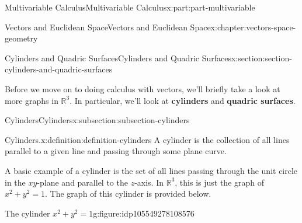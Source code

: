 \documentclass[twoside,10pt,]{book}
\newcommand{\terminology}[1]{\textbf{#1}}
\numberwithin{equation}{part}
\newlength{\qrsize}
\newlength{\previewwidth}
\newcommand{\RR}{\mathbb{R}}
\begin{document}
\begin{partptx}{Multivariable Calculus}{}{Multivariable Calculus}{}{}{x:part:part-multivariable}
\begin{chapterptx}{Vectors and Euclidean Space}{}{Vectors and Euclidean Space}{}{}{x:chapter:vectors-space-geometry}
%
%
\typeout{************************************************}
\typeout{************************************************}
%
\begin{sectionptx}{Cylinders and Quadric Surfaces}{}{Cylinders and Quadric Surfaces}{}{}{x:section:section-cylinders-and-quadric-surfaces}
\begin{introduction}{}%
Before we move on to doing calculus with vectors, we'll briefly take a look at more graphs in \(\RR^{3}\). In particular, we'll look at \terminology{cylinders} and \terminology{quadric surfaces}.%
\end{introduction}%
%
%
\typeout{************************************************}
\typeout{************************************************}
%
\begin{subsectionptx}{Cylinders}{}{Cylinders}{}{}{x:subsection:subsection-cylinders}
\begin{definition}{Cylinders.}{x:definition:definition-cylinders}%
%
A cylinder is the collection of all lines parallel to a given line and passing through some plane curve.%
\end{definition}
A basic example of a cylinder is the set of all lines passing through the unit circle in the \(xy\)-plane and parallel to the \(z\)-axis. In \(\RR^{3}\), this is just the graph of \(x^{2}+y^{2}=1\). The graph of this cylinder is provided below.%
\begin{figureptx}{The cylinder \(x^2+y^2=1\)}{g:figure:idp105549278108576}{}%
\centering
\setlength{\qrsize}{9em}
\setlength{\previewwidth}{\linewidth}
\addtolength{\previewwidth}{-\qrsize}
\begin{tcbraster}[raster columns=2, raster column skip=1pt, raster halign=center, raster force size=false, raster left skip=0pt, raster right skip=0pt]%
\begin{tcolorbox}[previewstyle, width=\previewwidth]%
%

\end{tcolorbox}
\end{tcbraster}
\end{figureptx}
\end{subsectionptx}
\end{sectionptx}
\end{chapterptx}
\end{partptx}
\end{document}

